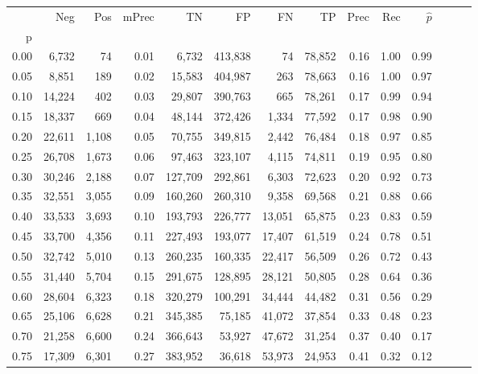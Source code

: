 \begin{tabular}{rrrrrrrrrrrrrr}
\toprule
{} &     Neg &    Pos & mPrec &       TN &       FP &      FN &      TP &  Prec &   Rec & $\hat{p}$ \\
p    &         &        &       &          &          &         &         &       &       &           \\
\midrule
0.00 &   6,732 &     74 &  0.01 &    6,732 &  413,838 &      74 &  78,852 &  0.16 &  1.00 &      0.99 \\
0.05 &   8,851 &    189 &  0.02 &   15,583 &  404,987 &     263 &  78,663 &  0.16 &  1.00 &      0.97 \\
0.10 &  14,224 &    402 &  0.03 &   29,807 &  390,763 &     665 &  78,261 &  0.17 &  0.99 &      0.94 \\
0.15 &  18,337 &    669 &  0.04 &   48,144 &  372,426 &   1,334 &  77,592 &  0.17 &  0.98 &      0.90 \\
0.20 &  22,611 &  1,108 &  0.05 &   70,755 &  349,815 &   2,442 &  76,484 &  0.18 &  0.97 &      0.85 \\
0.25 &  26,708 &  1,673 &  0.06 &   97,463 &  323,107 &   4,115 &  74,811 &  0.19 &  0.95 &      0.80 \\
0.30 &  30,246 &  2,188 &  0.07 &  127,709 &  292,861 &   6,303 &  72,623 &  0.20 &  0.92 &      0.73 \\
0.35 &  32,551 &  3,055 &  0.09 &  160,260 &  260,310 &   9,358 &  69,568 &  0.21 &  0.88 &      0.66 \\
0.40 &  33,533 &  3,693 &  0.10 &  193,793 &  226,777 &  13,051 &  65,875 &  0.23 &  0.83 &      0.59 \\
0.45 &  33,700 &  4,356 &  0.11 &  227,493 &  193,077 &  17,407 &  61,519 &  0.24 &  0.78 &      0.51 \\
0.50 &  32,742 &  5,010 &  0.13 &  260,235 &  160,335 &  22,417 &  56,509 &  0.26 &  0.72 &      0.43 \\
0.55 &  31,440 &  5,704 &  0.15 &  291,675 &  128,895 &  28,121 &  50,805 &  0.28 &  0.64 &      0.36 \\
0.60 &  28,604 &  6,323 &  0.18 &  320,279 &  100,291 &  34,444 &  44,482 &  0.31 &  0.56 &      0.29 \\
0.65 &  25,106 &  6,628 &  0.21 &  345,385 &   75,185 &  41,072 &  37,854 &  0.33 &  0.48 &      0.23 \\
0.70 &  21,258 &  6,600 &  0.24 &  366,643 &   53,927 &  47,672 &  31,254 &  0.37 &  0.40 &      0.17 \\
0.75 &  17,309 &  6,301 &  0.27 &  383,952 &   36,618 &  53,973 &  24,953 &  0.41 &  0.32 &      0.12 \\

\end{tabular}
